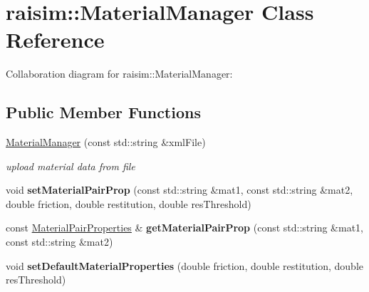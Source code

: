 \hypertarget{classraisim_1_1MaterialManager}{}\section{raisim\+:\+:Material\+Manager Class Reference}
\label{classraisim_1_1MaterialManager}


Collaboration diagram for raisim\+:\+:Material\+Manager\+:
\subsection*{Public Member Functions}
\begin{DoxyCompactItemize}
\item 
\mbox{\label{classraisim_1_1MaterialManager_a0c8aff71c80a556204872664d8b9e383}} 
\hyperlink{classraisim_1_1MaterialManager_a0c8aff71c80a556204872664d8b9e383}{Material\+Manager} (const std\+::string \&xml\+File)
\begin{DoxyCompactList}\small\item\em upload material data from file \end{DoxyCompactList}\item 
\mbox{\label{classraisim_1_1MaterialManager_a7916288c839accd066217e743d99b11c}} 
void {\bfseries set\+Material\+Pair\+Prop} (const std\+::string \&mat1, const std\+::string \&mat2, double friction, double restitution, double res\+Threshold)
\item 
\mbox{\label{classraisim_1_1MaterialManager_af07f0d417791a06e0d426777f9af9fb3}} 
const \hyperlink{structraisim_1_1MaterialPairProperties}{Material\+Pair\+Properties} \& {\bfseries get\+Material\+Pair\+Prop} (const std\+::string \&mat1, const std\+::string \&mat2)
\item 
\mbox{\label{classraisim_1_1MaterialManager_a00fb6bab44580cf175098fe2d873c36d}} 
void {\bfseries set\+Default\+Material\+Properties} (double friction, double restitution, double res\+Threshold)
\end{DoxyCompactItemize}
